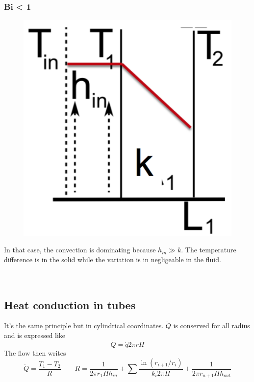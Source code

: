  			 \subsubsection{Bi < 1}
	 			\begin{figure}
 				\vspace{-5mm}
 				\includegraphics[scale=0.35]{ch3/9}
 				\end{figure}
 				In that case, the convection is dominating because $h_{in} \gg k$. The temperature difference is in the solid while the variation is in negligeable in the fluid. \\\\\\
 			
	\subsection{Heat conduction in tubes}
	It's the same principle but in cylindrical coordinates. $\dot{Q}$ is conserved for all radius and is expressed like 
	\begin{equation}
		\dot{Q} = \dot{q}2\pi r H
		\label{eq:3.18}
	\end{equation}
 	The flow then writes 
 	\begin{equation}
 			\dot{Q} = \frac{T_1-T_2}{R}\qquad R = \frac{1}{2\pi r_1 H h_{in}} + \sum \frac{\ln (r_{i+1}/r_i)}{k_i 2\pi H} + \frac{1}{2 \pi r_{n+1}Hh_{out}}
 	\end{equation}
 	
